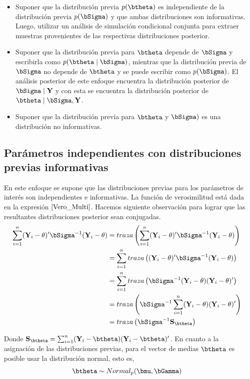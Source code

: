 \begin{itemize}
\item Suponer que la distribución previa $p(\btheta)$ es independiente de la distribución previa $p(\bSigma)$ y que ambas distribuciones son informativas. Luego, utilizar un análisis de simulación condicional conjunta para extraer muestras provenientes de las respectivas distribuciones posterior.
\item Suponer que la distribución previa para $\btheta$ depende de $\bSigma$ y escribirla como $p(\btheta \mid \bSigma)$, mientras que la distribución previa de $\bSigma$ no depende de $\btheta$ y se puede escribir como $p(\bSigma)$. El análisis posterior de este enfoque encuentra la distribución posterior de $\bSigma \mid \mathbf{Y}$ y con esta se encuentra la distribución posterior de $\btheta \mid \bSigma,\mathbf{Y}$.
\item Suponer que la distribución previa para $\btheta$ y $\bSigma)$ es una distribución no informativas.
\end{itemize}
  
\subsection{Parámetros independientes con distribuciones previas informativas}

En este enfoque se supone que las distribuciones previas para los parámetros de interés son independientes e informativas. La función de verosimilitud está dada en la expresión $\ref{Vero_Multi}$. Hacemos siguiente observación para lograr que las resultantes distribuciones posterior sean conjugadas. 
\begin{align*}
\sum_{i=1}^n(\mathbf{Y}_i-\theta)'\bSigma^{-1}(\mathbf{Y}_i-\theta)&=traza \left(\sum_{i=1}^n(\mathbf{Y}_i-\theta)'\bSigma^{-1}(\mathbf{Y}_i-\theta)\right)\\
&= \sum_{i=1}^ntraza\left((\mathbf{Y}_i-\theta)'\bSigma^{-1}(\mathbf{Y}_i-\theta)\right)\\
&= \sum_{i=1}^ntraza\left(\bSigma^{-1}(\mathbf{Y}_i-\theta)(\mathbf{Y}_i-\theta)'\right)\\
&= traza\left(\bSigma^{-1}\sum_{i=1}^n(\mathbf{Y}_i-\theta)(\mathbf{Y}_i-\theta)'\right)\\
&= traza\left(\bSigma^{-1}\mathbf{S}_{\btheta}\right)
\end{align*}

Donde $\mathbf{S}_{\btheta}=\sum_{i=1}^n(\mathbf{Y}_i-\btheta)(\mathbf{Y}_i-\btheta)'$. En cuanto a la asignación de las distribuciones previas, para el vector de medias $\btheta$ es posible usar la distribución normal, esto es,
\begin{equation*}
\btheta \sim Normal_p(\bmu,\bGamma)
\end{equation*}


